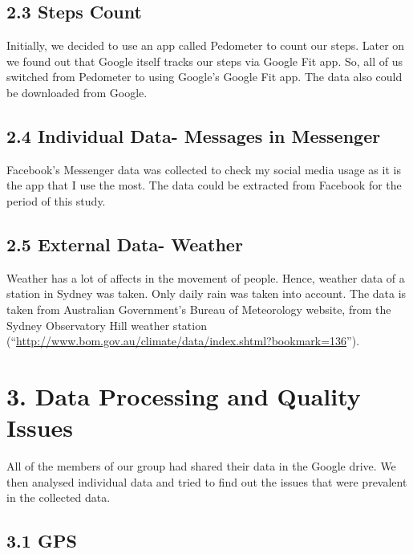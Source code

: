 \documentclass[
]{article}
\begin{document}
\hypertarget{steps-count}{%
\subsection{2.3 Steps Count}\label{steps-count}}

Initially, we decided to use an app called Pedometer to count our steps.
Later on we found out that Google itself tracks our steps via Google Fit
app. So, all of us switched from Pedometer to using Google's Google Fit
app. The data also could be downloaded from Google.

\hypertarget{individual-data--messages-in-messenger}{%
\subsection{2.4 Individual Data- Messages in
Messenger}\label{individual-data--messages-in-messenger}}

Facebook's Messenger data was collected to check my social media usage
as it is the app that I use the most. The data could be extracted from
Facebook for the period of this study.

\hypertarget{external-data--weather}{%
\subsection{2.5 External Data- Weather}\label{external-data--weather}}

Weather has a lot of affects in the movement of people. Hence, weather
data of a station in Sydney was taken. Only daily rain was taken into
account. The data is taken from Australian Government's Bureau of
Meteorology website, from the Sydney Observatory Hill weather station
(``\url{http://www.bom.gov.au/climate/data/index.shtml?bookmark=136}'').

\hypertarget{data-processing-and-quality-issues}{%
\section{3. Data Processing and Quality
Issues}\label{data-processing-and-quality-issues}}

All of the members of our group had shared their data in the Google
drive. We then analysed individual data and tried to find out the issues
that were prevalent in the collected data.

\hypertarget{gps-1}{%
\subsection{3.1 GPS}\label{gps-1}}
\end{document}
